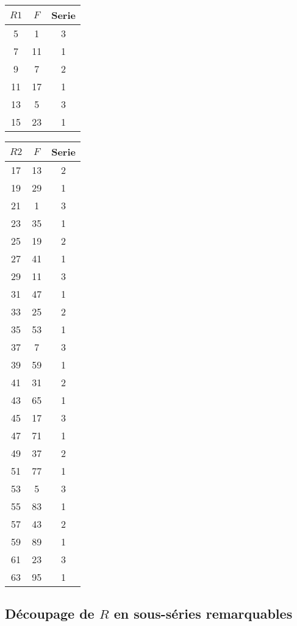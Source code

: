 \documentclass{book}
\begin{document}
\begin{tabular}{|c|c|c|}
	\hline
	$R1$ & $F$ & Serie \\
	\hline
	5 & 1 & 3 \\
	\hline
	7 & 11 & 1 \\
	\hline
	9 & 7 & 2 \\
	\hline
	11 & 17 & 1 \\
	\hline
	13 & 5 & 3 \\
	\hline
	15 & 23 & 1 \\
	\hline
\end{tabular}

\begin{tabular}{|c|c|c|}
	\hline
	$R2$ & $F$ & Serie \\
	\hline
	17 & 13 & 2 \\
	\hline
	19 & 29 & 1 \\
	\hline
	21 & 1 & 3 \\
	\hline
	23 & 35 & 1 \\
	\hline
	25 & 19 & 2 \\
	\hline
	27 & 41 & 1 \\
	\hline
	29 & 11 & 3 \\
	\hline
	31 & 47 & 1 \\
	\hline
	33 & 25 & 2 \\
	\hline
	35 & 53 & 1 \\
	\hline
	37 & 7 & 3 \\
	\hline
	39 & 59 & 1 \\
	\hline
	41 & 31 & 2 \\
	\hline
	43 & 65 & 1 \\
	\hline
	45 & 17 & 3 \\
	\hline
	47 & 71 & 1 \\
	\hline
	49 & 37 & 2 \\
	\hline
	51 & 77 & 1 \\
	\hline
	53 & 5 & 3 \\
	\hline
	55 & 83 & 1 \\
	\hline
	57 & 43 & 2 \\
	\hline
	59 & 89 & 1 \\
	\hline
	61 & 23 & 3 \\
	\hline
	63 & 95 & 1 \\
	\hline
\end{tabular}

\subsection{D\'ecoupage de $R$ en sous-s\'eries remarquables}
\end{document}
